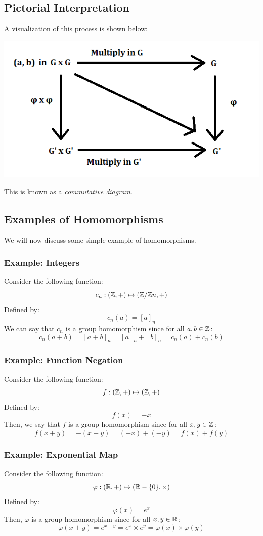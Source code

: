 \documentclass[letterpaper]{article}
\begin{document}
\subsection{Pictorial Interpretation}
A visualization of this process is shown below: 
\begin{center}
    \includegraphics[scale=0.7]{assets/homo_diagram.png}
\end{center}
This is known as a \emph{commutative diagram}.

\subsection{Examples of Homomorphisms}
We will now discuss some simple example of homomorphisms. 

\subsubsection{Example: Integers}
Consider the following function: 
\[c_n: (\mathbb{Z}, +) \mapsto (\mathbb{Z} / \mathbb{Z} n, +)\]
Defined by: 
\[c_{n}(a) = [a]_n\]
We can say that $c_n$ is a group homomorphism since for all $a, b \in \mathbb{Z}$: 
\[c_{n}(a + b) = [a + b]_n = [a]_n + [b]_n = c_{n}(a) + c_{n}(b)\]

\subsubsection{Example: Function Negation}
Consider the following function: 
\[f: (\mathbb{Z}, +) \mapsto (\mathbb{Z}, +)\]
Defined by: 
\[f(x) = -x\]
Then, we say that $f$ is a group homomorphism since for all $x, y \in \mathbb{Z}$: 
\[f(x + y) = -(x + y) = (-x) + (-y) = f(x) + f(y)\]

\subsubsection{Example: Exponential Map}
Consider the following function: 
\[\varphi: (\mathbb{R}, +) \mapsto (\mathbb{R} - \{0\}, \times)\]
Defined by: 
\[\varphi(x) = e^x\]
Then, $\varphi$ is a group homomorphism since for all $x, y \in \mathbb{R}$: 
\[\varphi(x + y) = e^{x + y} = e^x \times e^y = \varphi(x) \times \varphi(y)\]
\end{document}
